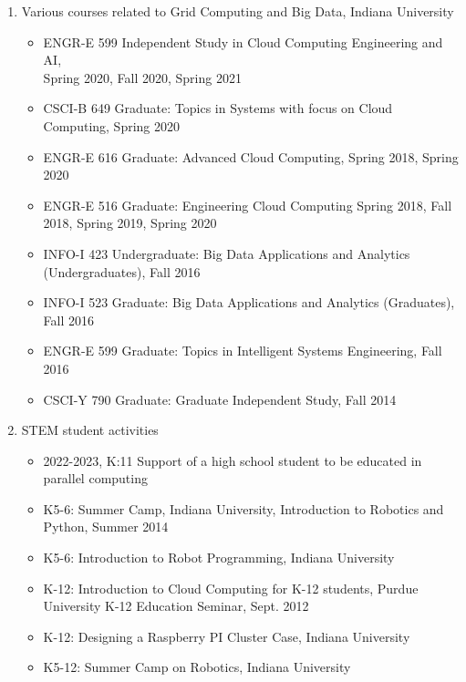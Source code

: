 \documentclass{article}
\begin{document}
\begin{enumerate}
\item  Various courses related to Grid Computing and Big Data,  Indiana University
  \begin{itemize}
        \item ENGR-E 599 Independent Study in Cloud Computing Engineering and AI, \\ Spring 2020, Fall 2020, Spring 2021
        \item CSCI-B 649 Graduate: Topics in Systems with focus on Cloud Computing, Spring 2020
        \item ENGR-E 616 Graduate: Advanced Cloud Computing, Spring 2018, Spring 2020
        \item ENGR-E 516 Graduate: Engineering Cloud Computing Spring 2018, Fall 2018, Spring 2019, Spring 2020
        \item INFO-I 423 Undergraduate: Big Data Applications and Analytics (Undergraduates), Fall 2016 
        \item INFO-I 523 Graduate: Big Data Applications and Analytics (Graduates), Fall 2016
        \item ENGR-E 599 Graduate: Topics in Intelligent Systems Engineering, Fall 2016
        \item CSCI-Y 790 Graduate: Graduate Independent Study, Fall 2014 
  \end{itemize}

  
\item  STEM student activities

  \begin{itemize}
    \item 2022-2023, K:11 Support of a high school student to be
      educated in parallel computing
    \item K5-6: Summer Camp, Indiana University, Introduction to Robotics and Python, Summer 2014
    \item K5-6: Introduction to Robot Programming, Indiana University  
    \item K-12: Introduction to Cloud Computing for K-12 students, Purdue University K-12 Education Seminar, Sept. 2012
    \item K-12: Designing a Raspberry PI Cluster Case, Indiana University
    \item K5-12: Summer Camp on Robotics, Indiana University

  \end{itemize}

\end{enumerate}

  
\end{document}
